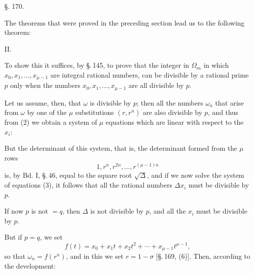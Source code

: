 
\begin{center}
\S. 170.

\end{center}

The theorems that were proved in the preceding section lead us to the following theorem:

II. 

To show this it suffices, by \S.\,145, to prove that the integer in $\Omega_m$
in which $x_0, x_1, \ldots, x_{\mu-1}$ are integral rational numbers, can be divisible by a rational prime $p$ only when the numbers $x_0, x_1, \ldots, x_{\mu-1}$ are all divisible by $p$.

Let us assume, then, that $\omega$ is divisible by $p$; then all the numbers $\omega_n$ that arise from $\omega$ by one of the $\mu$ substitutions $(r, r^n)$ are also divisible by $p$, and thus from (2) we obtain a system of $\mu$ equations which are linear with respect to the $x_i$:

But the determinant of this system, that is, the determinant formed from the $\mu$ rows
\[ 1, r^n, r^{2n}, \ldots, r^{(\mu-1)n} \]
is, by Bd. I, \S.\,46, equal to the square root $\sqrt{\varDelta}$, and if we now solve the system of equations (3), it follows that all the rational numbers $\varDelta x_i$ must be divisible by $p$.

If now $p$ is not $=q$, then $\varDelta$ is not divisible by $p$, and all the $x_i$ must be divisible by $p$.

But if $p = q$, we set
\[ f(t) = x_0 + x_1 t + x_2 t^2 + \cdots + x_{\mu-1} t^{\mu-1}, \]
so that $\omega_n = f(r^n)$, and in this we set $r = 1 - \sigma$ [\S.\,169, (6)]. Then, according to the  development:
